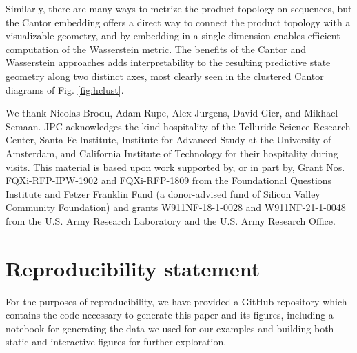 \documentclass[sigconf, anonymous, review]{acmart}
\begin{document}
Similarly, there are many ways to metrize the product topology on sequences, but
the Cantor embedding offers a direct way to connect the product topology with a
visualizable geometry, and by embedding in a single dimension enables efficient
computation of the Wasserstein metric. The benefits of the Cantor and
Wasserstein approaches adds interpretability to the resulting predictive state
geometry along two distinct axes, most clearly seen in the clustered Cantor
diagrams of Fig. \ref{fig:hclust}. 

\begin{acks}
  We thank Nicolas Brodu, Adam Rupe, Alex Jurgens, David Gier, and Mikhael
  Semaan. JPC acknowledges the kind hospitality of the Telluride Science
  Research Center, Santa Fe Institute, Institute for Advanced Study at the
  University of Amsterdam, and California Institute of Technology for their
  hospitality during visits. This material is based upon work supported by, or
  in part by, Grant Nos. FQXi-RFP-IPW-1902 and FQXi-RFP-1809 from the
  Foundational Questions Institute and Fetzer Franklin Fund (a donor-advised
  fund of Silicon Valley Community Foundation) and grants W911NF-18-1-0028 and
  W911NF-21-1-0048 from the U.S. Army Research Laboratory and the U.S. Army
  Research Office.  
\end{acks}

\section{Reproducibility statement}
For the purposes of reproducibility, we have provided a GitHub repository which
contains the code necessary to generate this paper and its figures, including a
notebook for generating the data we used for our examples and building both
static and interactive figures for further exploration.



\end{document}
